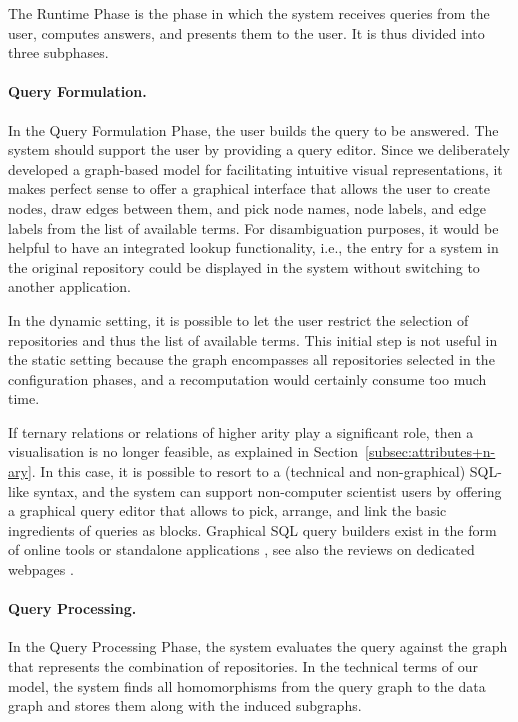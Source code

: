 The Runtime Phase is the phase in which the system receives queries from the user,
computes answers, and presents them to the user. It is thus divided into
three subphases.

\paragraph{Query Formulation.}

In the Query Formulation Phase, the user builds the query
to be answered. The system should support the user by providing a query editor.
Since we deliberately developed a graph-based model
for facilitating intuitive visual representations,
it makes perfect sense to offer a graphical interface
that allows the user to create nodes, draw edges between them,
and pick node names, node labels, and edge labels from the list of available terms.
For disambiguation purposes, it would be helpful to have an
integrated lookup functionality, i.e., the entry for a system
in the original repository could be displayed in the system
without switching to another application.

In the dynamic setting, it is possible to let the user
restrict the selection of repositories and thus the list of available terms.
This initial step is not useful in the static setting
because the graph encompasses all repositories selected in the configuration phases,
and a recomputation would certainly consume too much time.

If ternary relations or relations of higher arity play a significant role,
then a visualisation is no longer feasible, as explained in Section~\ref{subsec:attributes+n-ary}.
In this case, it is possible to resort to a (technical and non-graphical)
SQL-like syntax, and the system can support non-computer scientist users by 
offering a graphical query editor that allows to pick, arrange, and link
the basic ingredients of queries as blocks.
Graphical SQL query builders exist in the form of online tools or standalone applications
\autocite[e.g.,][]{VisualSQL,SQLeo}, see also the reviews on dedicated webpages
\autocite[e.g.,][]{ChartioVisualSQL,FinOnlBestVisualQueryBuilders}.

\paragraph{Query Processing.}

In the Query Processing Phase, the system evaluates the query against the
graph that represents the combination of repositories.
In the technical terms of our model, the system finds all homomorphisms from the query graph
to the data graph and stores them along with the induced subgraphs.

